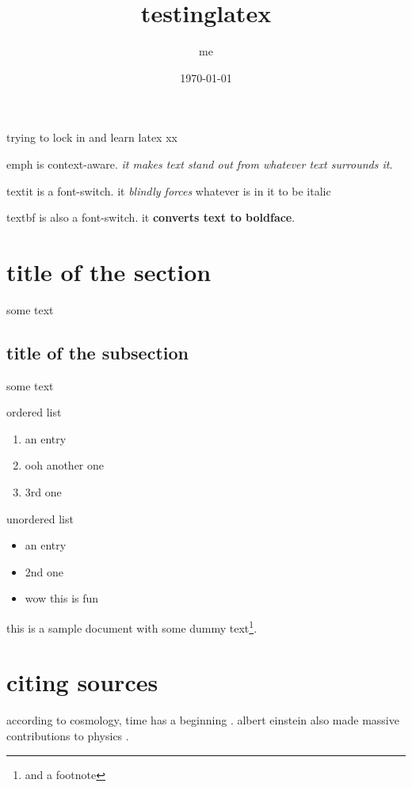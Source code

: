 \documentclass{article}
\title{testinglatex}
\author{me}
\date{\today}
\begin{document}
\maketitle 
trying to lock in and learn latex xx
\bigskip

emph is context-aware. \emph{it makes text \emph{stand out} from whatever text surrounds it}.

textit is a font-switch. it \textit{blindly forces} whatever is in it to be italic

textbf is also a font-switch. it \textbf{converts text to boldface}.

\section{title of the section}
some text
\subsection{title of the subsection}
some text
\bigskip

ordered list
\begin{enumerate}
\item an entry
\item ooh another one
\item 3rd one
\end{enumerate}

unordered list
\begin{itemize}
\item an entry
\item 2nd one
\item wow this is fun
\end{itemize}

this is a sample document with some dummy
text\footnote{and a footnote}.

\section{citing sources}

according to cosmology, time has a beginning \cite{hawking1988}. 
albert einstein also made massive contributions to physics \cite{einstein1905}.

\printbibliography
\end{document}
